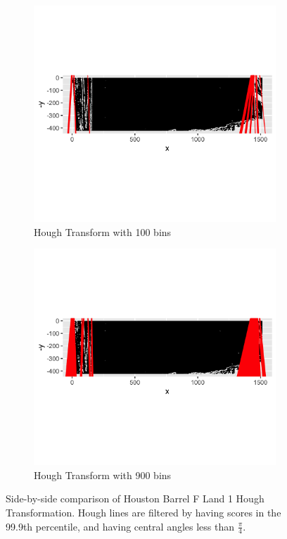 \documentclass[12pt]{article}
\theoremstyle{nonumberplain}
\begin{document}
\begin{figure}[!ht]
    \centering
      \begin{subfigure}{.4\textwidth}
      \centering
      \includegraphics[width = .9\textwidth]{../images/Houston_BarrelF_Bullet1_Hough_Bin100}
      \caption{Hough Transform with 100 bins}
      \label{fig: hough1}
      \end{subfigure}%
    \begin{subfigure}{.5\textwidth}
      \centering
      \includegraphics[width = .9\textwidth]{../images/Houston_BarrelF_Bullet1_Hough_Bin900}
      \caption{Hough Transform with 900 bins}
      \label{fig: hough2}
      \end{subfigure}
      \caption{Side-by-side comparison of Houston Barrel F Land 1 Hough Transformation. Hough lines are filtered by having scores in the 99.9th percentile, and having central angles less than $\frac{\pi}{4}$.}
      \label{fig: hough-compare}
\end{figure}
\end{document}
